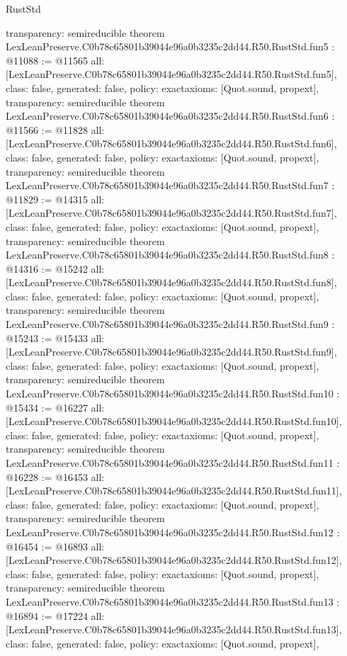 \begin{lexlean}{RustStd}
\begin{coremodule}
{  transparency: semireducible
}
theorem LexLeanPreserve.C0b78c65801b39044e96a0b3235c2dd44.R50.RustStd.fun5 : @11088 := @11565 {
  all: [LexLeanPreserve.C0b78c65801b39044e96a0b3235c2dd44.R50.RustStd.fun5],
  class: false,
  generated: false,
  policy: exact{axioms: [Quot.sound, propext]},
  transparency: semireducible
}
theorem LexLeanPreserve.C0b78c65801b39044e96a0b3235c2dd44.R50.RustStd.fun6 : @11566 := @11828 {
  all: [LexLeanPreserve.C0b78c65801b39044e96a0b3235c2dd44.R50.RustStd.fun6],
  class: false,
  generated: false,
  policy: exact{axioms: [Quot.sound, propext]},
  transparency: semireducible
}
theorem LexLeanPreserve.C0b78c65801b39044e96a0b3235c2dd44.R50.RustStd.fun7 : @11829 := @14315 {
  all: [LexLeanPreserve.C0b78c65801b39044e96a0b3235c2dd44.R50.RustStd.fun7],
  class: false,
  generated: false,
  policy: exact{axioms: [Quot.sound, propext]},
  transparency: semireducible
}
theorem LexLeanPreserve.C0b78c65801b39044e96a0b3235c2dd44.R50.RustStd.fun8 : @14316 := @15242 {
  all: [LexLeanPreserve.C0b78c65801b39044e96a0b3235c2dd44.R50.RustStd.fun8],
  class: false,
  generated: false,
  policy: exact{axioms: [Quot.sound, propext]},
  transparency: semireducible
}
theorem LexLeanPreserve.C0b78c65801b39044e96a0b3235c2dd44.R50.RustStd.fun9 : @15243 := @15433 {
  all: [LexLeanPreserve.C0b78c65801b39044e96a0b3235c2dd44.R50.RustStd.fun9],
  class: false,
  generated: false,
  policy: exact{axioms: [Quot.sound, propext]},
  transparency: semireducible
}
theorem LexLeanPreserve.C0b78c65801b39044e96a0b3235c2dd44.R50.RustStd.fun10 : @15434 := @16227 {
  all: [LexLeanPreserve.C0b78c65801b39044e96a0b3235c2dd44.R50.RustStd.fun10],
  class: false,
  generated: false,
  policy: exact{axioms: [Quot.sound, propext]},
  transparency: semireducible
}
theorem LexLeanPreserve.C0b78c65801b39044e96a0b3235c2dd44.R50.RustStd.fun11 : @16228 := @16453 {
  all: [LexLeanPreserve.C0b78c65801b39044e96a0b3235c2dd44.R50.RustStd.fun11],
  class: false,
  generated: false,
  policy: exact{axioms: [Quot.sound, propext]},
  transparency: semireducible
}
theorem LexLeanPreserve.C0b78c65801b39044e96a0b3235c2dd44.R50.RustStd.fun12 : @16454 := @16893 {
  all: [LexLeanPreserve.C0b78c65801b39044e96a0b3235c2dd44.R50.RustStd.fun12],
  class: false,
  generated: false,
  policy: exact{axioms: [Quot.sound, propext]},
  transparency: semireducible
}
theorem LexLeanPreserve.C0b78c65801b39044e96a0b3235c2dd44.R50.RustStd.fun13 : @16894 := @17224 {
  all: [LexLeanPreserve.C0b78c65801b39044e96a0b3235c2dd44.R50.RustStd.fun13],
  class: false,
  generated: false,
  policy: exact{axioms: [Quot.sound, propext]},
}
\end{coremodule}
\end{lexlean}
